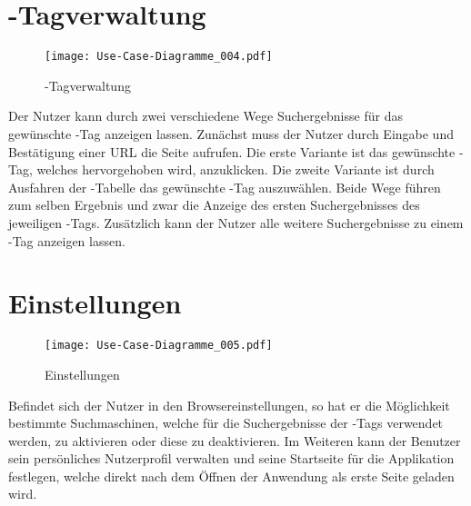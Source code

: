\section{\SEARCH-Tagverwaltung}
\begin{figure}[htb]
\texttt{[image: Use-Case-Diagramme\_004.pdf]}
	\caption{\SEARCH-Tagverwaltung}
	\label{fig:SEARCH-Tagverwaltung}
\end{figure}
Der Nutzer kann durch zwei verschiedene Wege Suchergebnisse für das gewünschte \SEARCH-Tag anzeigen lassen. Zunächst muss der Nutzer durch Eingabe und Bestätigung einer URL die Seite aufrufen. Die erste Variante ist das gewünschte \SEARCH-Tag, welches hervorgehoben wird, anzuklicken. Die zweite Variante ist durch Ausfahren der \SEARCH-Tabelle das gewünschte \SEARCH-Tag auszuwählen. Beide Wege führen zum selben Ergebnis und zwar die Anzeige des ersten Suchergebnisses des jeweiligen \SEARCH-Tags. Zusätzlich kann der Nutzer alle weitere Suchergebnisse zu einem \SEARCH-Tag anzeigen lassen.

\section{Einstellungen}
\begin{figure}[htb]
\texttt{[image: Use-Case-Diagramme\_005.pdf]}
	\caption{Einstellungen}
	\label{fig:Einstellungen}
\end{figure}
Befindet sich der Nutzer in den Browsereinstellungen, so hat er die Möglichkeit bestimmte Suchmaschinen, welche für die Suchergebnisse der \SEARCH-Tags verwendet werden, zu aktivieren oder diese zu deaktivieren. Im Weiteren kann der Benutzer sein persönliches Nutzerprofil verwalten und seine Startseite für die Applikation festlegen, welche direkt nach dem Öffnen der Anwendung als erste Seite geladen wird.
